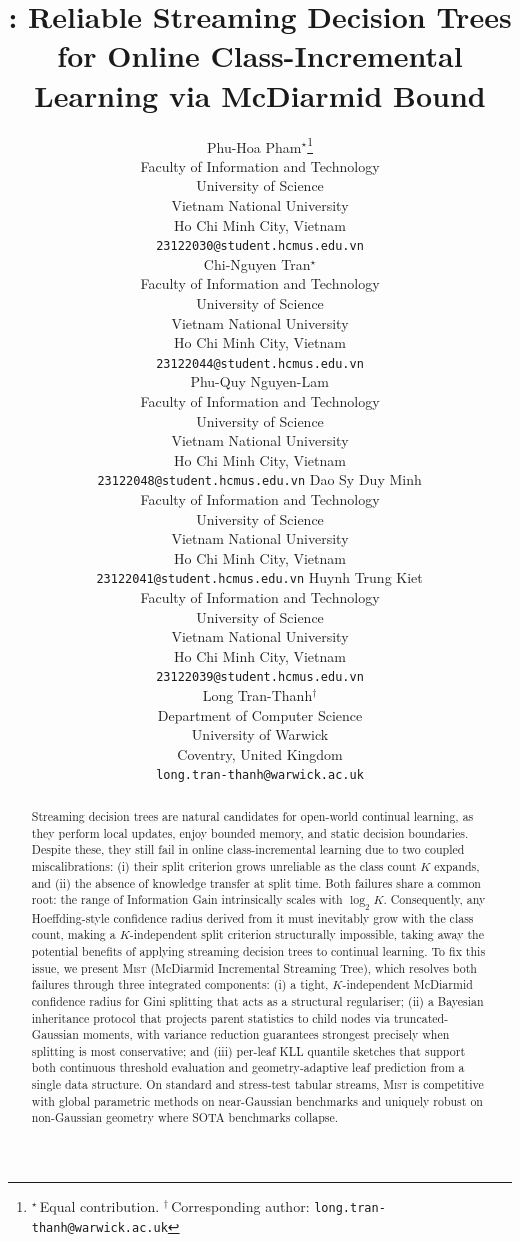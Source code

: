 \documentclass{article}
\title{
    \mist{}: Reliable Streaming Decision Trees for Online Class-Incremental Learning via McDiarmid Bound
}
\author{%
  Phu-Hoa Pham$^{\star}$\thanks{$^\star$\,Equal contribution.\quad
    $^\dagger$\,Corresponding author:
    \texttt{long.tran-thanh@warwick.ac.uk}}\\
  Faculty of Information and Technology \\
  University of Science\\
  Vietnam National University \\
  Ho Chi Minh City, Vietnam \\
  \texttt{23122030@student.hcmus.edu.vn} \\
  \And
  Chi-Nguyen Tran$^{\star}$ \\
  Faculty of Information and Technology \\
  University of Science\\
  Vietnam National University \\
  Ho Chi Minh City, Vietnam \\
  \texttt{23122044@student.hcmus.edu.vn} \\
  \And
  Phu-Quy Nguyen-Lam$^{}$ \\
  Faculty of Information and Technology \\
  University of Science\\
  Vietnam National University \\
  Ho Chi Minh City, Vietnam \\
  \texttt{23122048@student.hcmus.edu.vn}
  \And
  Dao Sy Duy Minh$^{}$ \\
  Faculty of Information and Technology \\
  University of Science\\
  Vietnam National University \\
  Ho Chi Minh City, Vietnam \\
  \texttt{23122041@student.hcmus.edu.vn}
  \And
  Huynh Trung Kiet$^{}$ \\
  Faculty of Information and Technology \\
  University of Science\\
  Vietnam National University \\
  Ho Chi Minh City, Vietnam \\
  \texttt{23122039@student.hcmus.edu.vn} \\
  \And
  Long Tran-Thanh$^{\dagger}$ \\
  Department of Computer Science \\
  University of Warwick \\
  Coventry, United Kingdom \\
  \texttt{long.tran-thanh@warwick.ac.uk}
}
\newcommand{\mist}{\textsc{Mist}}
\begin{document}
\maketitle
 
\begin{abstract}
Streaming decision trees are natural candidates for open-world continual learning, as they perform local updates, enjoy bounded memory, and static decision boundaries. Despite these, they still fail in online class-incremental learning due to two coupled miscalibrations: (i) their split criterion grows unreliable as the class count $K$ expands, and (ii) the absence of knowledge transfer at split time. Both failures share a common root: the range of Information Gain intrinsically scales with $\log_2 K$. Consequently, any Hoeffding-style confidence radius derived from it must inevitably grow with the class count, making a $K$-independent split criterion structurally impossible, taking away the potential benefits of applying streaming decision trees to continual learning. To fix this issue, we present \mist{} (McDiarmid Incremental Streaming Tree), which resolves both failures through three integrated components: (i) a tight, $K$-independent McDiarmid confidence radius for Gini splitting that acts as a structural regulariser; (ii) a Bayesian inheritance protocol that projects parent statistics to child nodes via truncated-Gaussian moments, with variance reduction guarantees strongest precisely when splitting is most conservative; and (iii) per-leaf KLL quantile sketches that support both continuous threshold evaluation and geometry-adaptive leaf prediction from a single data structure. On standard and stress-test tabular streams, \mist{} is competitive with global parametric methods on near-Gaussian benchmarks and uniquely robust on non-Gaussian geometry where SOTA benchmarks collapse.
\end{abstract}
\end{document}
